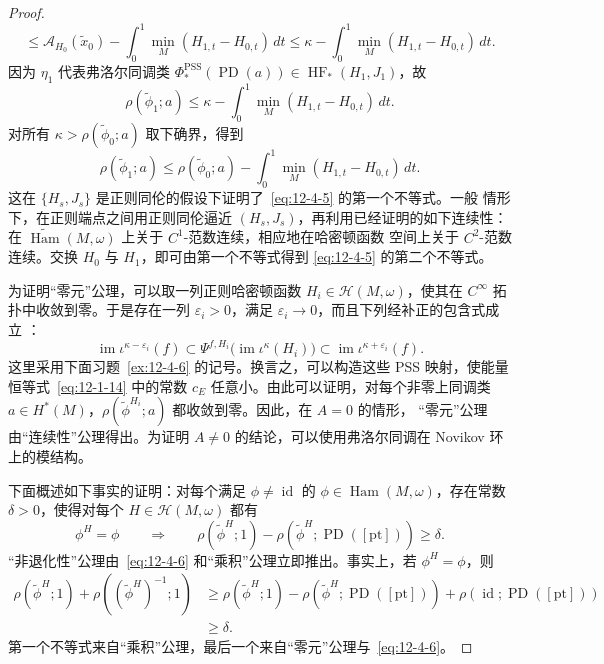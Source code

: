 \begin{proof}
\[  \le\mathcal A_{H_0}(\widetilde x_0)
  -\int_0^1\min_M(H_{1,t}-H_{0,t})\,dt
  \le\kappa-\int_0^1\min_M(H_{1,t}-H_{0,t})\,dt.
\]
因为 $\eta_1$ 代表弗洛尔同调类
$\Phi_*^{\mathrm{PSS}}(\operatorname{PD}(a))\in\operatorname{HF}_*(H_1,J_1)$，故
\[
  \rho(\widetilde\phi_1;a)
  \le\kappa-\int_0^1\min_M(H_{1,t}-H_{0,t})\,dt.
\]
对所有 $\kappa>\rho(\widetilde\phi_0;a)$ 取下确界，得到
\[
  \rho(\widetilde\phi_1;a)
  \le\rho(\widetilde\phi_0;a)
  -\int_0^1\min_M(H_{1,t}-H_{0,t})\,dt.
\]
这在 $\{H_s,J_s\}$ 是正则同伦的假设下证明了~\eqref{eq:12-4-5} 的第一个不等式。一般
情形下，在正则端点之间用正则同伦逼近 $(H_s,J_s)$，再利用已经证明的如下连续性：在
$\widetilde{\operatorname{Ham}}(M,\omega)$ 上关于 $C^1$-范数连续，相应地在哈密顿函数
空间上关于 $C^2$-范数连续。交换 $H_0$ 与 $H_1$，即可由第一个不等式得到
\eqref{eq:12-4-5} 的第二个不等式。

为证明“零元”公理，可以取一列正则哈密顿函数
$H_i\in\mathcal H(M,\omega)$，使其在 $C^\infty$ 拓扑中收敛到零。于是存在一列
$\varepsilon_i>0$，满足 $\varepsilon_i\to0$，而且下列经补正的包含式成立
：
\[
  \operatorname{im}\iota^{\kappa-\varepsilon_i}(f)
  \subset\Psi^{f,H_i}\bigl(\operatorname{im}\iota^\kappa(H_i)\bigr)
  \subset\operatorname{im}\iota^{\kappa+\varepsilon_i}(f).
\]
这里采用下面习题~\ref{ex:12-4-6} 的记号。换言之，可以构造这些 PSS 映射，使能量
恒等式~\eqref{eq:12-1-14} 中的常数 $c_E$ 任意小。由此可以证明，对每个非零上同调类
$a\in H^*(M)$，$\rho(\widetilde\phi^{H_i};a)$ 都收敛到零。因此，在 $A=0$ 的情形，
“零元”公理由“连续性”公理得出。为证明 $A\ne0$ 的结论，可以使用弗洛尔同调在 Novikov
环上的模结构。

下面概述如下事实的证明：对每个满足 $\phi\ne\operatorname{id}$ 的
$\phi\in\operatorname{Ham}(M,\omega)$，存在常数 $\delta>0$，使得对每个
$H\in\mathcal H(M,\omega)$ 都有
\begin{equation}\label{eq:12-4-6}
  \phi^H=\phi\qquad\Longrightarrow\qquad
  \rho(\widetilde\phi^H;1)
  -\rho(\widetilde\phi^H;\operatorname{PD}([\mathrm{pt}]))\ge\delta.
\end{equation}
“非退化性”公理由~\eqref{eq:12-4-6} 和“乘积”公理立即推出。事实上，若
$\phi^H=\phi$，则
\[
\begin{aligned}
  \rho(\widetilde\phi^H;1)+\rho((\widetilde\phi^H)^{-1};1)
  &\ge\rho(\widetilde\phi^H;1)
  -\rho(\widetilde\phi^H;\operatorname{PD}([\mathrm{pt}]))
  +\rho(\operatorname{id};\operatorname{PD}([\mathrm{pt}]))\\
  &\ge\delta.
\end{aligned}
\]
第一个不等式来自“乘积”公理，最后一个来自“零元”公理与~\eqref{eq:12-4-6}。


\end{proof}
